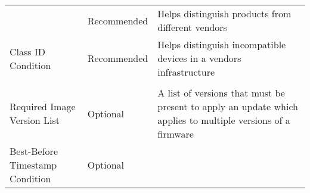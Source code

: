 \documentclass[0-thesis.tex]{subfiles}
\begin{document}
\begin{longtable}[]{@{}lll@{}}
\begin{minipage}[t]{0.23\columnwidth}
    \end{minipage} & \begin{minipage}[t]{0.26\columnwidth}\raggedright\strut
    Recommended\strut
    \end{minipage} & \begin{minipage}[t]{0.60\columnwidth}\raggedright\strut
    Helps distinguish products from different vendors\strut
    \end{minipage}\tabularnewline
    \begin{minipage}[t]{0.23\columnwidth}\raggedright\strut
    Class ID Condition\strut
    \end{minipage} & \begin{minipage}[t]{0.26\columnwidth}\raggedright\strut
    Recommended\strut
    \end{minipage} & \begin{minipage}[t]{0.60\columnwidth}\raggedright\strut
    Helps distinguish incompatible devices in a vendors infrastructure\strut
    \end{minipage}\tabularnewline
    \begin{minipage}[t]{0.23\columnwidth}\raggedright\strut
    \strut
    \end{minipage} & \begin{minipage}[t]{0.26\columnwidth}\raggedright\strut
    \strut
    \end{minipage} & \begin{minipage}[t]{0.60\columnwidth}\raggedright\strut
    \strut
    \end{minipage}\tabularnewline
    \begin{minipage}[t]{0.23\columnwidth}\raggedright\strut
    Required Image Version List\strut
    \end{minipage} & \begin{minipage}[t]{0.26\columnwidth}\raggedright\strut
    Optional\strut
    \end{minipage} & \begin{minipage}[t]{0.60\columnwidth}\raggedright\strut
    A list of versions that must be present to apply an update which applies
    to multiple versions of a firmware\strut
    \end{minipage}\tabularnewline
    \begin{minipage}[t]{0.23\columnwidth}\raggedright\strut
    Best-Before Timestamp Condition\strut
    \end{minipage} & \begin{minipage}[t]{0.26\columnwidth}\raggedright\strut
    Optional\strut
    \end{minipage} & \begin{minipage}[t]{0.60\columnwidth}\raggedright\strut

\end{minipage}
\end{longtable}
\end{document}
